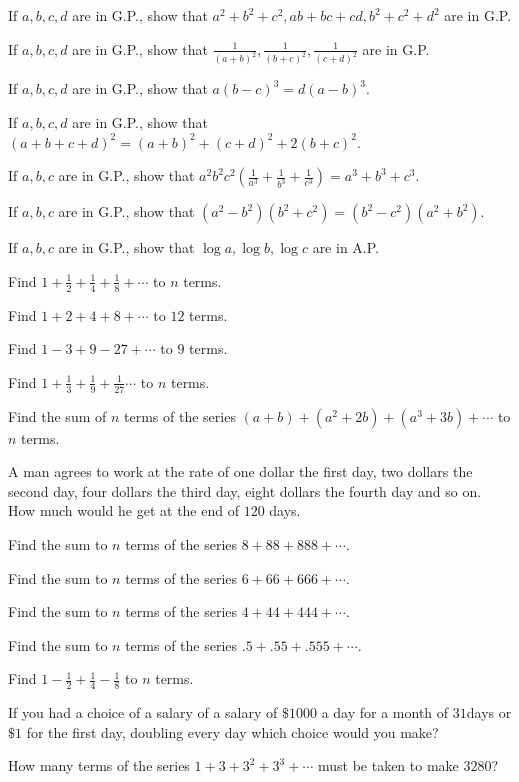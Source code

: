 \item If $a, b, c, d$ are in G.P., show that $a^2 + b^2 + c^2, ab + bc + cd, b^2 + c^2 + d^2$ are in G.P.
\item If $a, b, c, d$ are in G.P., show that $\frac{1}{(a + b)^2}, \frac{1}{(b + c)^2}, \frac{1}{(c + d)^2}$ are in G.P.
\item If $a, b, c, d$ are in G.P., show that $a(b - c)^3 = d(a - b)^3$.
\item If $a, b, c, d$ are in G.P., show that $(a + b + c + d)^2 = (a + b)^2 + (c + d)^2 + 2(b + c)^2$.
\item If $a, b, c$ are in G.P., show that $a^2b^2c^2\left(\frac{1}{a^3} + \frac{1}{b^3} + \frac{1}{c^3}\right) = a^3 + b^3 + c^3$.
\item If $a, b, c$ are in G.P., show that $(a^2 - b^2)(b^2 + c^2) = (b^2 - c^2)(a^2 + b^2)$.
\item If $a, b, c$ are in G.P., show that $\log a, \log b, \log c$ are in A.P.
\item Find $1 + \frac{1}{2} + \frac{1}{4} + \frac{1}{8} + \cdots$ to $n$ terms.
\item Find $1 + 2 + 4 + 8 + \cdots$ to $12$ terms.
\item Find $1 - 3 + 9 - 27 + \cdots$ to $9$ terms.
\item Find $1 + \frac{1}{3} + \frac{1}{9} + \frac{1}{27} \cdots$ to $n$ terms.
\item Find the sum of $n$ terms of the series $(a + b) + (a^2 + 2b) + (a^3 + 3b) + \cdots$ to $n$ terms.
\item A man agrees to work at the rate of one dollar the first day, two dollars the second day, four dollars the third day, eight
  dollars the fourth day and so on. How much would he get at the end of $120$ days.
\item Find the sum to $n$ terms of the series $8 + 88 + 888 + \cdots$.
\item  Find the sum to $n$ terms of the series $6 + 66 + 666 + \cdots$.
\item Find the sum to $n$ terms of the series $4 + 44 + 444 + \cdots$.
\item Find the sum to $n$ terms of the series $.5 + .55 + .555 + \cdots$.
\item Find $1 - \frac{1}{2} + \frac{1}{4} - \frac{1}{8}$ to $n$ terms.
\item If you had a choice of a salary of a salary of $\$ 1000$ a day for a month of $31$days or $\$ 1$ for the first day, doubling
  every day which choice would you make?
\item How many terms of the series $1 + 3 + 3^2 + 3^3 + \cdots$ must be taken to make $3280$?
